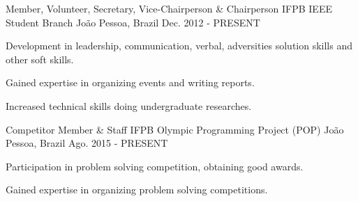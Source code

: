 \begin{cventries}
  \cventry
    {Member, Volunteer, Secretary, Vice-Chairperson \& Chairperson} %
    {IFPB IEEE Student Branch} %
    {João Pessoa, Brazil} %
    {Dec. 2012 - PRESENT} %
    {
      \begin{cvitems} %
		\item{Development in leadership, communication, verbal, adversities solution skills and other soft skills.}
		\item{Gained expertise in organizing events and writing reports.}
		\item{Increased technical skills doing undergraduate researches.}
      \end{cvitems}
    }
  \cventry
    {Competitor Member \& Staff} %
    {IFPB Olympic Programming Project (POP)} %
    {João Pessoa, Brazil} %
    {Ago. 2015 - PRESENT} %
    {
      \begin{cvitems} %
        \item {Participation in problem solving competition, obtaining good awards.}
        \item {Gained expertise in organizing problem solving competitions.}
      \end{cvitems}
    } 


\end{cventries}
